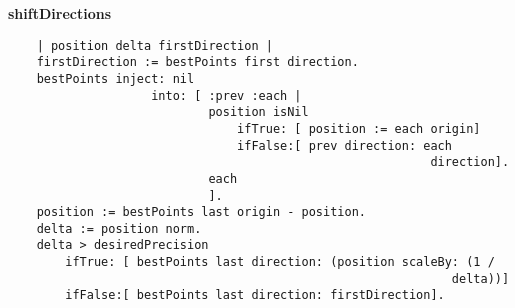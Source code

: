 {\bf shiftDirections}
\begin{verbatim}
    | position delta firstDirection |
    firstDirection := bestPoints first direction.
    bestPoints inject: nil
                    into: [ :prev :each |
                            position isNil
                                ifTrue: [ position := each origin]
                                ifFalse:[ prev direction: each
                                                           direction].
                            each
                            ].
    position := bestPoints last origin - position.
    delta := position norm.
    delta > desiredPrecision
        ifTrue: [ bestPoints last direction: (position scaleBy: (1 /
                                                              delta))]
        ifFalse:[ bestPoints last direction: firstDirection].
\end{verbatim}
